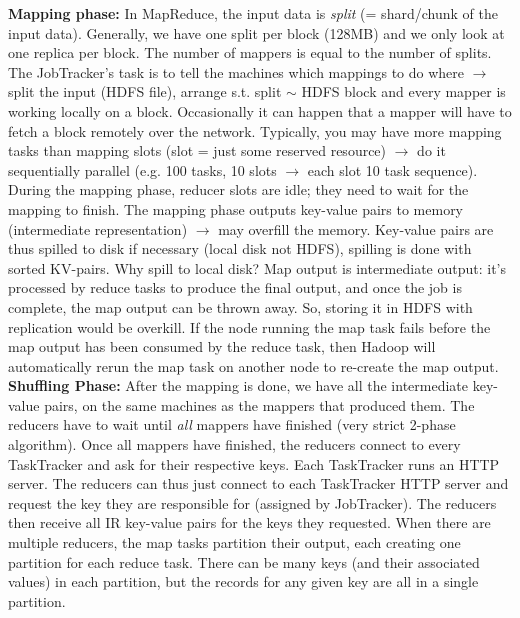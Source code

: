\documentclass[11pt,oneside,a4paper]{article}
\begin{document}
\textbf{Mapping phase:} In MapReduce, the input data is \textit{split} (= shard/chunk of the input data). Generally, we have one split per block (128MB) and we only look at one replica per block. The number of mappers is equal to the number of splits. The JobTracker's task is to tell the machines which mappings to do where $\rightarrow$ split the input (HDFS file), arrange s.t. split $\sim$ HDFS block and every mapper is working locally on a block. Occasionally it can happen that a mapper will have to fetch a block remotely over the network. Typically, you may have more mapping tasks than mapping slots (slot = just some reserved resource) $\rightarrow$ do it sequentially parallel (e.g. 100 tasks, 10 slots $\rightarrow$ each slot 10 task sequence). During the mapping phase, reducer slots are idle; they need to wait for the mapping to finish. The mapping phase outputs key-value pairs to memory (intermediate representation) $\rightarrow$ may overfill the memory. Key-value pairs are thus spilled to disk if necessary (local disk not HDFS), spilling is done with sorted KV-pairs. Why spill to local disk? Map output is intermediate output: it’s processed by reduce tasks to produce the final output, and once the job is complete, the map output can be thrown away. So, storing it in HDFS with replication would be overkill. If the node running the map task fails before the map output has been consumed by the reduce task, then Hadoop will automatically rerun the map task on another node to re-create the map output.\\

\textbf{Shuffling Phase:} After the mapping is done, we have all the intermediate key-value pairs, on the same machines as the mappers that produced them. The reducers have to wait until \textit{all} mappers have finished (very strict 2-phase algorithm). Once all mappers have finished, the reducers connect to every TaskTracker and ask for their respective keys. Each TaskTracker runs an HTTP server. The reducers can thus just connect to each TaskTracker HTTP server and request the key they are responsible for (assigned by JobTracker). The reducers then receive all IR key-value pairs for the keys they requested. When there are multiple reducers, the map tasks partition their output, each creating one partition for each reduce task. There can be many keys (and their associated values) in each partition, but the records for any given key are all in a single partition.
\end{document}

